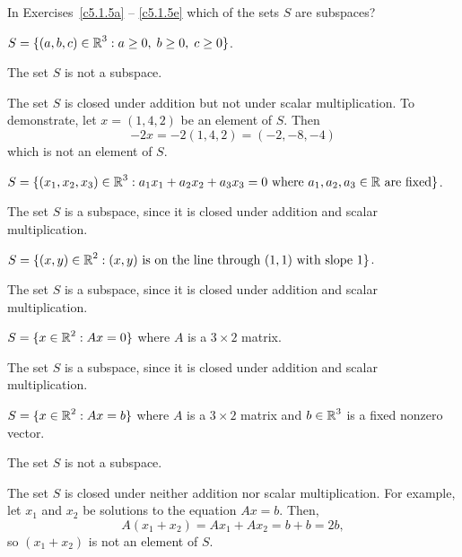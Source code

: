 \documentclass{ximera}
\begin{document}
\noindent In Exercises~\ref{c5.1.5a} -- \ref{c5.1.5e} which of the
sets $S$ are subspaces?
\begin{exercise} \label{c5.1.5a}
$S = \{(a,b,c)\in\mbox{$\Bbb{R}$}^3 : a\ge 0, \; b\ge 0,\; c\ge 0\}$.

\begin{solution}
\ans The set $S$ is not a subspace.

\soln The set $S$ is closed under addition but not under scalar
multiplication.  To demonstrate, let $x = (1,4,2)$ be an element of $S$. 
Then
\[
-2x = -2(1,4,2) = (-2,-8,-4)
\]
which is not an element of $S$.

\end{solution}
\end{exercise}
\begin{exercise} \label{c5.1.5b}
$S = \{(x_1,x_2,x_3)\in\mbox{$\Bbb{R}$}^3 : a_1x_1+a_2x_2+a_3x_3=0
\mbox{ where } a_1,a_2,a_3\in\mbox{$\Bbb{R}$} \mbox{ are fixed}\}$.

\begin{solution}
The set $S$ is a subspace, since it is closed under
addition and scalar multiplication.

 
\end{solution}
\end{exercise}
\begin{exercise} \label{c5.1.5c}
$S = \{(x,y)\in\mbox{$\Bbb{R}$}^2: (x,y) \mbox{ is on the line through }
(1,1) \mbox{ with slope } 1\}$.

\begin{solution}
The set $S$ is a subspace, since it is closed under
addition and scalar multiplication.

\end{solution}
\end{exercise}
\begin{exercise} \label{c5.1.5d}
$S = \{x\in\mbox{$\Bbb{R}$}^2: Ax=0\}$ where $A$ is a $3\times 2$ matrix.

\begin{solution}
The set $S$ is a subspace, since it is closed under
addition and scalar multiplication.

\end{solution}
\end{exercise}
\begin{exercise} \label{c5.1.5e}
$S = \{x\in\mbox{$\Bbb{R}$}^2: Ax=b\}$ where $A$ is a $3\times 2$ matrix
	and $b\in\mbox{$\Bbb{R}$}^3$ is a fixed nonzero vector.

\begin{solution}
\ans The set $S$ is not a subspace.

\soln The set $S$ is closed under neither addition nor scalar
multiplication.  For example, let $x_1$ and $x_2$ be solutions to the
equation $Ax = b$.  Then,
\[
A(x_1 + x_2) = Ax_1 + Ax_2 = b + b = 2b,
\]
so $(x_1 + x_2)$ is not an element of $S$.

\end{solution}
\end{exercise}
\end{document}
